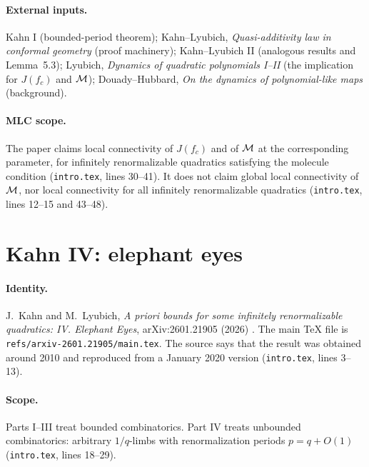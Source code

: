 \paragraph{External inputs.}
Kahn I (bounded-period theorem); Kahn--Lyubich, \emph{Quasi-additivity law in conformal geometry}
(proof machinery); Kahn--Lyubich II (analogous results and Lemma~5.3); Lyubich, \emph{Dynamics of
quadratic polynomials I--II} (the implication for $J(f_c)$ and $\mathcal M$); Douady--Hubbard, \emph{On the
dynamics of polynomial-like maps} (background).

\paragraph{MLC scope.}
The paper claims local connectivity of $J(f_c)$ and of $\mathcal M$ at the corresponding parameter, for
infinitely renormalizable quadratics satisfying the molecule condition (\texttt{intro.tex}, lines
30--41).  It does not claim global local connectivity of $\mathcal M$, nor local connectivity for all
infinitely renormalizable quadratics (\texttt{intro.tex}, lines 12--15 and 43--48).

\section{Kahn IV: elephant eyes}
\label{sec:kahn-IV}

\paragraph{Identity.}
J.~Kahn and M.~Lyubich, \emph{A priori bounds for some infinitely renormalizable quadratics:
IV. Elephant Eyes}, arXiv:2601.21905 (2026) \cite{KahnLyubichElephant}.  The main TeX file is
\texttt{refs/arxiv-2601.21905/main.tex}.  The source says that the result was obtained around
2010 and reproduced from a January 2020 version (\texttt{intro.tex}, lines 3--13).

\paragraph{Scope.}
Parts I--III treat bounded combinatorics.  Part IV treats unbounded combinatorics: arbitrary
$1/q$-limbs with renormalization periods $p=q+O(1)$ (\texttt{intro.tex}, lines 18--29).

